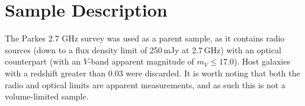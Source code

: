 \documentclass[a4paper,fleqn,usenatbib]{mnras}
\begin{document}




































	

\section{Sample Description}
	\label{sec:samp}
	The Parkes 2.7 GHz survey \citep{Ekers1989} was used as a parent sample, as it contains radio sources (down to a flux density limit of 250\,mJy at 2.7\,GHz) with an optical counterpart (with an $V$-band apparent magnitude of $m_V \le 17.0$). Host galaxies with a redshift greater than 0.03 were discarded. It is worth noting that both the radio and optical limits are apparent measurements, and as such this is not a volume-limited sample.
\end{document}
